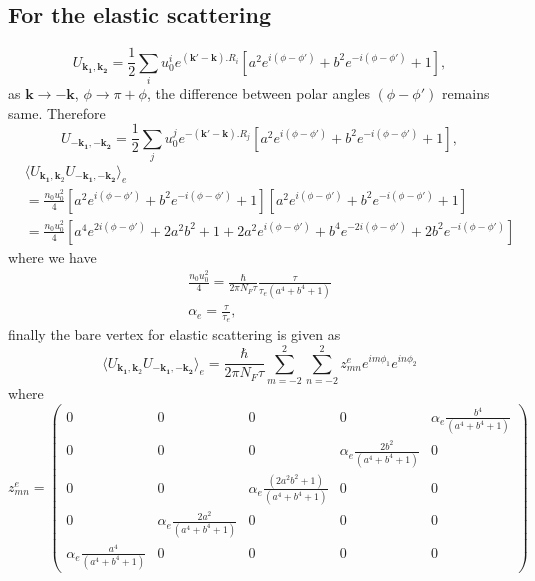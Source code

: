 \documentclass[aps,prb,amsmath,amssymb,footinbib,showpacs,twocolumn]{revtex4-2}
\begin{document}
\begin{widetext}
\subsection{For the elastic scattering}
\begin{equation}
    U_{\mathbf{k_{1},k_{2}}}= \frac{1}{2}\sum_{i}u^{i}_{0}e^{(\mathbf{k'-k}).R_{i}}\left[a^{2}e^{i(\phi-\phi')}+ b^{2}e^{-i(\phi-\phi')}+1 \right],
\end{equation}
as $\mathbf{k}\to \mathbf{-k}$, $\phi \to \pi+\phi$, the difference between polar angles $(\phi-\phi')$ remains same. Therefore 
\begin{equation}
  U_{\mathbf{-k_{1}, -k_{2}}}= \frac{1}{2}\sum_{j}u^{j}_{0}e^{-(\mathbf{k'-k}).R_{j}}\left[a^{2}e^{i(\phi-\phi')}+ b^{2}e^{-i(\phi-\phi')}+1 \right],   
\end{equation}
\begin{align}
    &\langle U_{\mathbf{k_1},\mathbf{k}_{2}}U_{\mathbf{-k_1},\mathbf{-k_2}}\bigl \rangle_{e}\nonumber\\&= \frac{n_{0}u_{0}^{2}}{4} \left[a^{2}e^{i(\phi-\phi')}+ b^{2}e^{-i(\phi-\phi')}+1 \right] \left[a^{2}e^{i(\phi-\phi')}+ b^{2}e^{-i(\phi-\phi')}+1 \right] \nonumber\\
    &= \frac{n_{0}u_{0}^{2}}{4}\left[a^{4}e^{2i(\phi-\phi')}+ 2a^{2}b^{2}+1 + 2a^{2}e^{i(\phi-\phi')}+b^{4}e^{-2i(\phi-\phi')}+2b^{2}e^{-i(\phi-\phi')}\right]
  \end{align}
where we have
\begin{align}
    \frac{n_{0}u_{0}^{2}}{4}=  \frac{\hbar}{2\pi N_{F}\tau}\frac{\tau}{\tau_{e}(a^{4}+b^{4}+1)} \\
    \alpha_{e}= \frac{\tau}{\tau_{e}},
\end{align}
finally the bare vertex for elastic scattering is given as
\begin{equation}
     \langle U_{\mathbf{k_1},\mathbf{k}_{2}}U_{\mathbf{-k_1},\mathbf{-k_2}}\bigl \rangle_{e}=\frac{\hbar}{2\pi N_{F}\tau}\sum_{m=-2}^{2}\sum_{n=-2}^{2}z^{e}_{mn}e^{im\phi_{1}}e^{in\phi_{2}}
\end{equation}
where
\begin{equation}
 z^{e}_{mn} =   \begin{pmatrix}
 0 & 0 & 0 & 0 & \alpha_{e}\frac{b^{4}}{(a^{4}+b^{4}+1)}\\
        0 & 0 & 0 & \alpha_{e}\frac{2b^{2}}{(a^{4}+b^{4}+1)} & 0 \\
        0 & 0 & \alpha_{e}\frac{(2a^{2}b^{2}+1)}{(a^{4}+b^{4}+1)} & 0 & 0 \\
        0 &\alpha_{e}\frac{2a^{2}}{(a^{4}+b^{4}+1)} & 0 & 0 & 0\\
        \alpha_{e}\frac{a^{4}}{(a^{4}+b^{4}+1)} & 0 & 0 & 0 & 0
         \end{pmatrix}
\end{equation}

\end{widetext}
\end{document}
